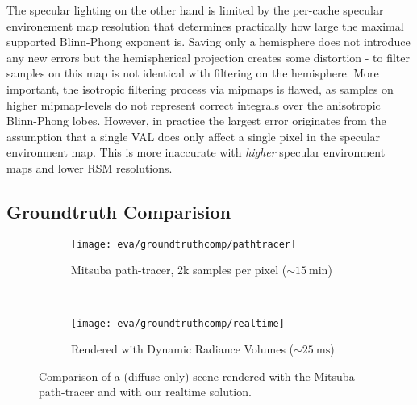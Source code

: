 \documentclass[thesis.tex]{subfiles}
\begin{document}
The specular lighting on the other hand is limited by the per-cache specular environement map resolution that determines practically how large the maximal supported Blinn-Phong exponent is.
Saving only a hemisphere does not introduce any new errors but the hemispherical projection creates some distortion - to filter samples on this map is not identical with filtering on the hemisphere.
More important, the isotropic filtering process via mipmaps is flawed, as samples on higher mipmap-levels do not represent correct integrals over the anisotropic Blinn-Phong lobes.
However, in practice the largest error originates from the assumption that a single VAL does only affect a single pixel in the specular environment map.
This is more inaccurate with \emph{higher} specular environment maps and lower RSM resolutions.



%

\subsection{Groundtruth Comparision}
\begin{figure}[h]
\centering
\begin{subfigure}[b]{0.7\textwidth}
\texttt{[image: eva/groundtruthcomp/pathtracer]}
\caption{Mitsuba \cite{bib:mitsuba} path-tracer, 2k samples per pixel ($\sim\SI{15}{\minute}$)}
\end{subfigure}
\\
\begin{subfigure}[b]{0.7\textwidth}
\texttt{[image: eva/groundtruthcomp/realtime]}
\caption{Rendered with Dynamic Radiance Volumes ($\sim\SI{25}{\milli\second}$)}
\end{subfigure}
\caption{Comparison of a (diffuse only) scene rendered with the Mitsuba \cite{bib:mitsuba} path-tracer and with our realtime solution.}
\label{fig:groundtruthcomparision}
\end{figure}
\end{document}
